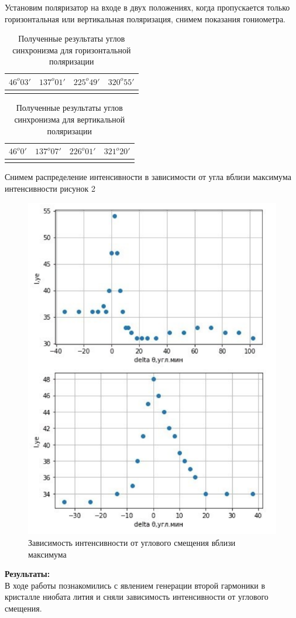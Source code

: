 \documentclass[a4paper, 12pt]{article}%
\begin{document}
	\par Установим поляризатор на входе в двух положениях, когда пропускается только горизонтальная или вертикальная поляризация, снимем показания гониометра.
	
	\begin{longtable}{|c|c|c|c|}
			\hline
			$46^o03'$& $137^o01'$&$225^o49'$ &$320^o55'$\\
			\hline
		\caption{Полученные результаты углов синхронизма для горизонтальной поляризации}
	\end{longtable}
	
	\begin{longtable}{|c|c|c|c|}
		\hline
		$46^o0'$&$137^o07' $&$226^o01' $&$321^o20'$\\
		\hline
		\caption{Полученные результаты углов синхронизма для вертикальной поляризации}
	\end{longtable}
	
	
	\newpage
	\par Снимем распределение интенсивности в зависимости от угла вблизи максимума интенсивности рисунок 2
	
	\begin{figure}[H]
		\centering
		\includegraphics[width=0.6\linewidth]{graph.png}
		\caption{Зависимость интенсивности от углового смещения вблизи максимума}
		\label{fig:enter-label}
	\end{figure}
	
	\textbf{Результаты: }\\
	
	В ходе работы познакомились с явлением генерации второй гармоники в кристалле ниобата лития и сняли зависимость интенсивности от углового смещения.
	
	
	
	
	
	
	
	
	
	
	
\end{document}
